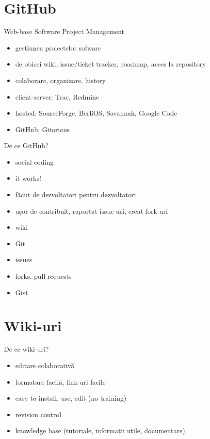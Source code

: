 \documentclass{beamer}
\begin{document}
\section{GitHub}

\begin{frame}{Web-base Software Project Management}
  \begin{itemize}
    \item gestiunea proiectelor sofware
    \item de obicei wiki, issue/ticket tracker, roadmap, acces la repository
    \item colaborare, organizare, history
    \item client-server: Trac, Redmine
    \item hosted: SourceForge, BerliOS, Savannah, Google Code
    \item GitHub, Gitorious
  \end{itemize}
\end{frame}

\begin{frame}{De ce GitHub?}
  \begin{itemize}
    \item social coding
    \item it works!
    \item făcut de dezvoltatori pentru dezvoltatori
    \item ușor de contribuit, raportat issue-uri, creat fork-uri
    \item wiki
    \item Git
    \item issues
    \item forks, pull requests
    \item Gist
  \end{itemize}
\end{frame}

\section{Wiki-uri}

\begin{frame}{De ce wiki-uri?}
  \begin{itemize}
    \item editare colaborativă
    \item formatare facilă, link-uri facile
    \item easy to install, use, edit (no training)
    \item revision control
    \item knowledge base (tutoriale, informații utile, documentare)
  \end{itemize}
\end{frame}
\end{document}
